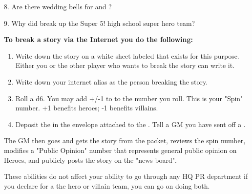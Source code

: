 \documentclass[green]{LRSguildcamp1}
\begin{document}
8. Are there wedding bells for \cYoungest{\MYsupername} and \cYS{\MYsupername} ?

9. Why did \cYoungest{\MYsupername} break up the Super 5! high school super hero team?

\textbf{To break a story via the Internet you do the following:
}\begin{enumerate}
\item Write down the story on a white sheet labeled \wPressRelease{} that exists for this purpose. Either you or the other player who wants to break the story can write it. 
\item Write down your internet alias as the person breaking the story.  
\item Roll a d6.  You may add +/-1 to to the number you roll. This is your "Spin" number.  +1 benefits heroes; -1 benefits villains.
\item Deposit the \wPressRelease{} in the envelope attached to the \sComputer{}. 
Tell a GM you have sent off a \wPressRelease{}.
\end{enumerate}

The GM then goes and gets the story from the packet, reviews the spin number, modifies a "Public Opinion" number that represents general public opinion on Heroes, and publicly posts the story on the "news board". 

These abilities do not affect your ability to go through any HQ PR department if you declare for a the hero or villain team, you can go on doing both. 




\end{document}
